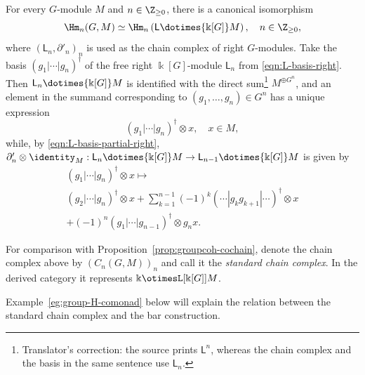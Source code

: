 \begin{proposition}
\label{prop:grouph-chain}
	For every $G$-module $M$ and $n\in\Z_{\geq0}$, there is a canonical
	isomorphism
	\[ \Hm_n(G, M) \simeq \Hm_n\left( \mathsf{L} \dotimes{\Bbbk[G]} M\right), \quad n \in \Z_{\geq 0}, \]
	where $(\mathsf{L}_n,\partial'_n)_n$ is used as the chain complex of right
	$G$-modules. Take the basis $(g_1|\cdots|g_n)^\dagger$ of the free right
	$\Bbbk[G]$-module $\mathsf{L}_n$ from \eqref{eqn:L-basis-right}. Then
	$\mathsf{L}_n\dotimes{\Bbbk[G]}M$ is identified with the direct
	sum\footnote{Translator's correction: the source prints $\mathsf{L}^n$,
	whereas the chain complex and the basis in the same sentence use
	$\mathsf{L}_n$.} $M^{\oplus G^n}$, and an element in the summand
	corresponding to $(g_1,\ldots,g_n)\in G^n$ has a unique expression
	\[ (g_1 | \cdots | g_n)^\dagger \otimes x, \quad x \in M, \]
	while, by \eqref{eqn:L-basis-partial-right},
	$\partial'_n\otimes\identity_M:\mathsf{L}_n\dotimes{\Bbbk[G]}M\to
	\mathsf{L}_{n-1}\dotimes{\Bbbk[G]}M$ is given by
	\begin{multline*}
		(g_1 | \cdots | g_n)^\dagger \otimes x \mapsto \\
		(g_2 | \cdots | g_n)^\dagger \otimes x + \sum_{k=1}^{n-1} (-1)^k (\cdots | g_k g_{k+1} | \cdots)^\dagger \otimes x \\
		+ (-1)^n (g_1 | \cdots | g_{n-1})^\dagger \otimes g_n x.
	\end{multline*}

	For comparison with Proposition~\ref{prop:groupcoh-cochain}, denote the
	chain complex above by $(C_n(G,M))_n$ and call it the \emph{standard chain
	complex}. In the derived category it represents
	$\Bbbk\otimesL[{\Bbbk[G]}]M$.
\end{proposition}

Example~\ref{eg:group-H-comonad} below will explain the relation between the
standard chain complex and the bar construction.

